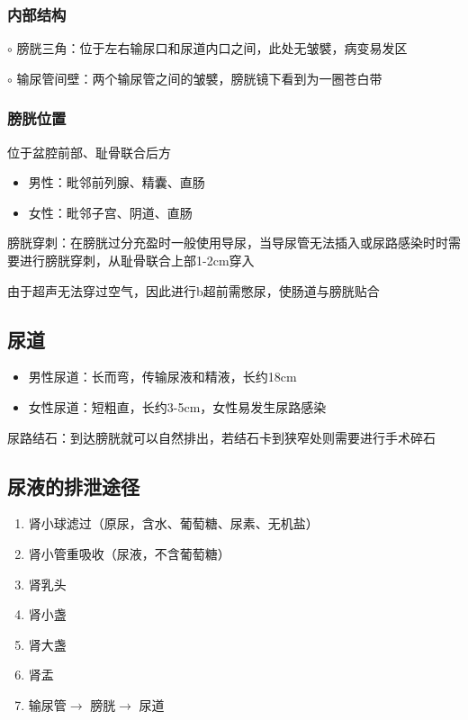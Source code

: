 \subsubsection*{内部结构}%
\label{subsub:内部结构}
$\circ$ 膀胱三角：位于左右输尿口和尿道内口之间，此处无皱襞，病变易发区

$\circ$ 输尿管间壁：两个输尿管之间的皱襞，膀胱镜下看到为一圈苍白带
\subsubsection*{膀胱位置}%
\label{subsub:膀胱位置}
位于盆腔前部、耻骨联合后方
\begin{itemize}
    \item 男性：毗邻前列腺、精囊、直肠
    \item 女性：毗邻子宫、阴道、直肠
\end{itemize}
\begin{notation}
    膀胱穿刺：在膀胱过分充盈时一般使用导尿，当导尿管无法插入或尿路感染时时需要进行膀胱穿刺，从耻骨联合上部1-2cm穿入

    由于超声无法穿过空气，因此进行b超前需憋尿，使肠道与膀胱贴合
\end{notation}
\subsection{尿道}%
\label{sub:尿道}
\begin{itemize}
    \item 男性尿道：长而弯，传输尿液和精液，长约18cm
    \item 女性尿道：短粗直，长约3-5cm，女性易发生尿路感染
\end{itemize}
\begin{notation}
    尿路结石：到达膀胱就可以自然排出，若结石卡到狭窄处则需要进行手术碎石
\end{notation}
\subsection{尿液的排泄途径}%
\label{sub:尿液的排泄途径}
\begin{enumerate}
    \item 肾小球滤过（原尿，含水、葡萄糖、尿素、无机盐）
    \item 肾小管重吸收（尿液，不含葡萄糖）
    \item 肾乳头
    \item 肾小盏
    \item 肾大盏
    \item 肾盂
    \item 输尿管$\to$ 膀胱$\to$ 尿道
\end{enumerate}
